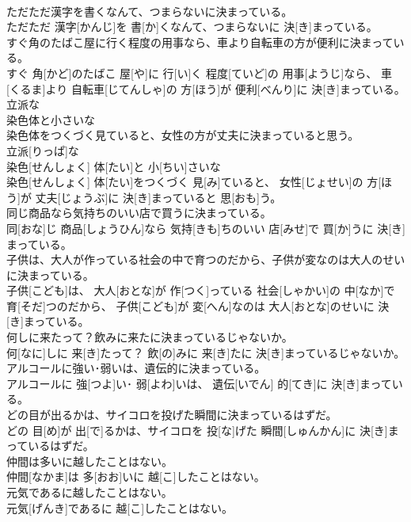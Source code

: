 \documentclass[8pt]{extreport}
\begin{document}
\begin{CJK}{UTF8}{min}
\\	ただただ漢字を書くなんて、つまらないに決まっている。	
\\	ただただ 漢字[かんじ]を 書[か]くなんて、つまらないに 決[き]まっている。
\\	すぐ角のたばこ屋に行く程度の用事なら、車より自転車の方が便利に決まっている。	
\\	すぐ 角[かど]のたばこ 屋[や]に 行[い]く 程度[ていど]の 用事[ようじ]なら、 車[くるま]より 自転車[じてんしゃ]の 方[ほう]が 便利[べんり]に 決[き]まっている。
\\	立派な
\\	染色体と小さいな
\\	染色体をつくづく見ていると、女性の方が丈夫に決まっていると思う。	
\\	立派[りっぱ]な 
\\	染色[せんしょく] 体[たい]と 小[ちい]さいな 
\\	染色[せんしょく] 体[たい]をつくづく 見[み]ていると、 女性[じょせい]の 方[ほう]が 丈夫[じょうぶ]に 決[き]まっていると 思[おも]う。
\\	同じ商品なら気持ちのいい店で買うに決まっている。	
\\	同[おな]じ 商品[しょうひん]なら 気持[きも]ちのいい 店[みせ]で 買[か]うに 決[き]まっている。
\\	子供は、大人が作っている社会の中で育つのだから、子供が変なのは大人のせいに決まっている。	
\\	子供[こども]は、 大人[おとな]が 作[つく]っている 社会[しゃかい]の 中[なか]で 育[そだ]つのだから、 子供[こども]が 変[へん]なのは 大人[おとな]のせいに 決[き]まっている。
\\	何しに来たって？飲みに来たに決まっているじゃないか。	
\\	何[なに]しに 来[き]たって？ 飲[の]みに 来[き]たに 決[き]まっているじゃないか。
\\	アルコールに強い･弱いは、遺伝的に決まっている。	
\\	アルコールに 強[つよ]い･ 弱[よわ]いは、 遺伝[いでん] 的[てき]に 決[き]まっている。
\\	どの目が出るかは、サイコロを投げた瞬間に決まっているはずだ。	
\\	どの 目[め]が 出[で]るかは、サイコロを 投[な]げた 瞬間[しゅんかん]に 決[き]まっているはずだ。
\\	仲間は多いに越したことはない。	
\\	仲間[なかま]は 多[おお]いに 越[こ]したことはない。
\\	元気であるに越したことはない。	
\\	元気[げんき]であるに 越[こ]したことはない。

\end{CJK}
\end{document}
